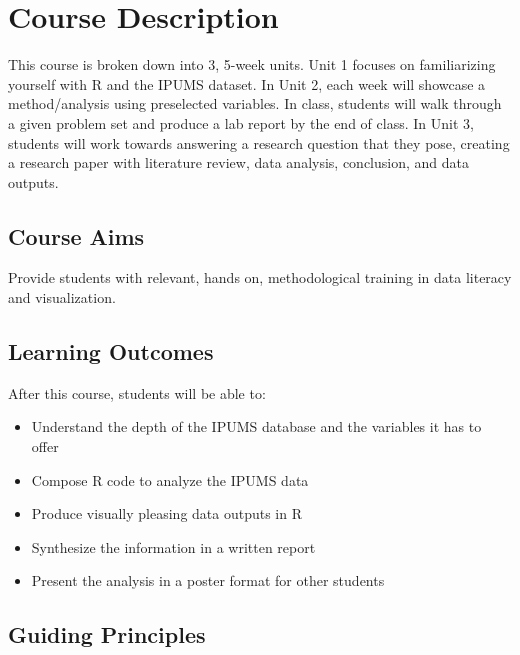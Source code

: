\documentclass[
]{book}
\providecommand{\tightlist}{%
  \setlength{\itemsep}{0pt}\setlength{\parskip}{0pt}}
\begin{document}
\hypertarget{course-description}{%
\chapter*{Course Description}\label{course-description}}

This course is broken down into 3, 5-week units. Unit 1 focuses on familiarizing yourself with R and the IPUMS dataset. In Unit 2, each week will showcase a method/analysis using preselected variables. In class, students will walk through a given problem set and produce a lab report by the end of class. In Unit 3, students will work towards answering a research question that they pose, creating a research paper with literature review, data analysis, conclusion, and data outputs.

\hypertarget{course-aims}{%
\section*{Course Aims}\label{course-aims}}

Provide students with relevant, hands on, methodological training in data literacy and visualization.

\hypertarget{learning-outcomes}{%
\section*{Learning Outcomes}\label{learning-outcomes}}

After this course, students will be able to:

\begin{itemize}
\tightlist
\item
  Understand the depth of the IPUMS database and the variables it has to\\
  offer
\item
  Compose R code to analyze the IPUMS data
\item
  Produce visually pleasing data outputs in R
\item
  Synthesize the information in a written report
\item
  Present the analysis in a poster format for other students
\end{itemize}

\hypertarget{guiding-principles}{%
\section*{Guiding Principles}\label{guiding-principles}}
\end{document}
